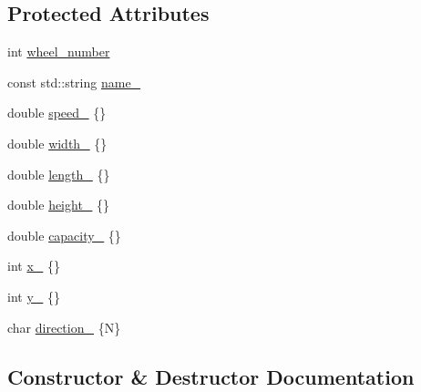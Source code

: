 \subsection*{Protected Attributes}
\begin{DoxyCompactItemize}
\item 
int \hyperlink{classfp_1_1_land_based_wheeled_ac50206eb412222a4d3c8f494c5dbd09b}{wheel\+\_\+number}
\item 
const std\+::string \hyperlink{classfp_1_1_land_based_wheeled_a72094d60b6dbfa33b6e5cab4a8e5f7c4}{name\+\_\+}
\item 
double \hyperlink{classfp_1_1_land_based_wheeled_a65bfb90a4e7fe10c87f30d276d9db80c}{speed\+\_\+} \{\}
\item 
double \hyperlink{classfp_1_1_land_based_wheeled_ab36bf6c7c4d986d6e88982b224e1ad1a}{width\+\_\+} \{\}
\item 
double \hyperlink{classfp_1_1_land_based_wheeled_addf50162ea822bf0484978cc08afd07a}{length\+\_\+} \{\}
\item 
double \hyperlink{classfp_1_1_land_based_wheeled_a2a5ae9e9307a22c9538f51ab366d7f57}{height\+\_\+} \{\}
\item 
double \hyperlink{classfp_1_1_land_based_wheeled_abf13221333a556a215b951d45568f03a}{capacity\+\_\+} \{\}
\item 
int \hyperlink{classfp_1_1_land_based_wheeled_a575a73a2601f480d2edbc5daa4cc5bf1}{x\+\_\+} \{\}
\item 
int \hyperlink{classfp_1_1_land_based_wheeled_a5b66ada6988a2b8ce6efafa971dfd9c6}{y\+\_\+} \{\}
\item 
char \hyperlink{classfp_1_1_land_based_wheeled_a71bec8ed4710864eb7a9534b3d39e060}{direction\+\_\+} \{\textquotesingle{}N\textquotesingle{}\}
\end{DoxyCompactItemize}


\subsection{Constructor \& Destructor Documentation}
\mbox{\label{classfp_1_1_land_based_wheeled_a0fe67f1df86ad377e0ef9d64a64f9416}} 
